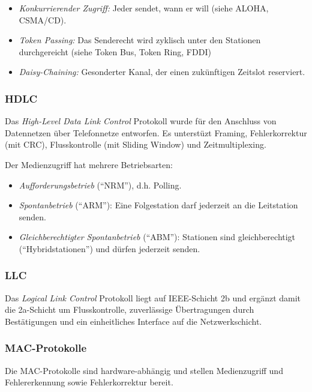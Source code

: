 \documentclass[a4paper,parskip=half*,DIV=15,fontsize=11pt]{scrartcl}
\begin{document}
\begin{itemize}
\item \emph{Konkurrierender Zugriff:} Jeder sendet, wann er will (siehe ALOHA, CSMA/CD).
\item \emph{Token Passing:} Das Senderecht wird zyklisch unter den Stationen durchgereicht (siehe Token Bus, Token Ring, FDDI)
\item \emph{Daisy-Chaining:} Gesonderter Kanal, der einen zukünftigen Zeitslot reserviert.
\end{itemize}

\subsubsection{HDLC}

Das \emph{High-Level Data Link Control} Protokoll wurde für den Anschluss von Datennetzen über Telefonnetze entworfen.
Es unterstüzt Framing, Fehlerkorrektur (mit CRC), Flusskontrolle (mit Sliding Window) und Zeitmultiplexing.

Der Medienzugriff hat mehrere Betriebsarten:
\begin{itemize}
\item \emph{Aufforderungsbetrieb} (``NRM''), d.h. Polling.
\item \emph{Spontanbetrieb} (``ARM''): Eine Folgestation darf jederzeit an die Leitstation senden.
\item \emph{Gleichberechtigter Spontanbetrieb} (``ABM''): Stationen sind gleichberechtigt (``Hybridstationen'') und dürfen jederzeit senden.
\end{itemize}

\subsubsection{LLC}

Das \emph{Logical Link Control} Protokoll liegt auf IEEE-Schicht 2b und ergänzt damit die 2a-Schicht um Flusskontrolle, zuverlässige Übertragungen durch Bestätigungen und ein einheitliches Interface auf die Netzwerkschicht.

\subsubsection{MAC-Protokolle}

Die MAC-Protokolle sind hardware-abhängig und stellen Medienzugriff und Fehlererkennung sowie Fehlerkorrektur bereit.
\end{document}
